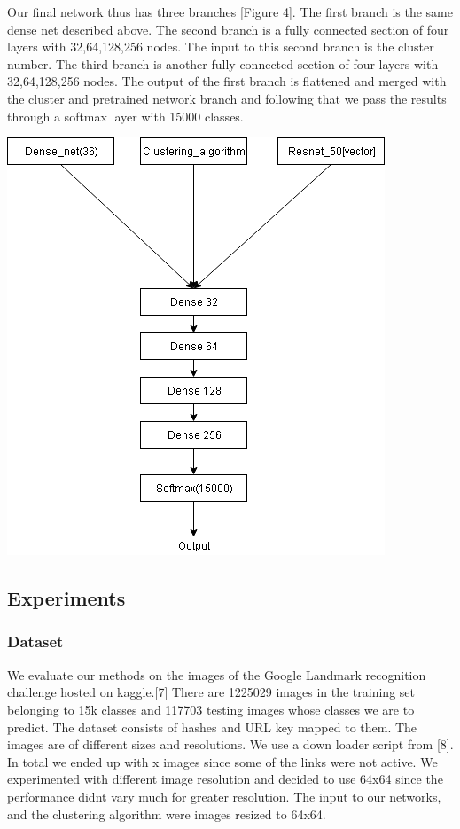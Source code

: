 \documentclass{article}
\begin{document}
Our final network thus has three branches [Figure 4]. The first branch is the same dense net described above. The second branch is a fully connected section of four layers with 32,64,128,256 nodes. The input to this second branch is the cluster number. The third branch is another fully connected section of four layers with 32,64,128,256 nodes. 
The output of the first branch is flattened and merged with the cluster and pretrained network branch and following that we pass the results through a softmax layer with 15000 classes.
\begin{center}
	\includegraphics[width=\textwidth]{final}
\end{center} 
\subsection{Experiments}

\subsubsection{Dataset}

We evaluate our methods on the images of the Google Landmark recognition challenge hosted on kaggle.[7]
There are 1225029 images in the training set belonging to 15k classes and 117703 testing images whose classes we are to predict. The dataset consists of hashes and URL key mapped to them. The images are of different sizes and resolutions. We use a down loader script from [8]. In total we ended up with x images since some of the links were not active.
We experimented with different image resolution and decided to use 64x64 since the performance didnt vary much for greater resolution. The input to our networks, and the clustering algorithm were images resized to 64x64.
\end{document}
